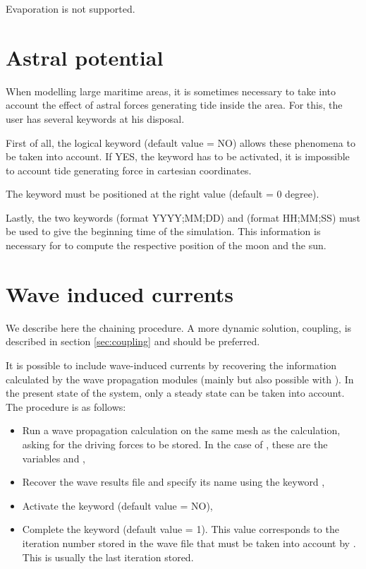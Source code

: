 Evaporation is not supported.


\section{Astral potential}
\label{sec:astral:pot}
When modelling large maritime areas, it is sometimes necessary to take into
account the effect of astral forces generating tide inside the area.
For this, the user has several keywords at his disposal.

First of all, the logical keyword 
(default value = NO) allows these phenomena to be taken into account.
If YES, the keyword  has to be activated,
it is impossible to account tide generating force in cartesian coordinates.

The keyword  must be positioned at the right
value (default = 0 degree).

Lastly, the two keywords  (format YYYY;MM;DD)
and  (format HH;MM;SS) must be used
to give the beginning time of the simulation.
This information is necessary for  to compute the respective
position of the moon and the sun.


\section{Wave induced currents}

We describe here the chaining procedure.
A more dynamic solution, coupling, is described in section \ref{sec:coupling}
and should be preferred.

It is possible to include wave-induced currents by recovering the information
calculated by the wave propagation modules (mainly \tomawac but also possible
with \artemis).
In the present state of the system, only a steady state can be taken into
account.
The procedure is as follows:

\begin{itemize}
\item Run a wave propagation calculation on the same mesh as the 
calculation, asking for the driving forces to be stored.
In the case of \tomawac, these are the variables  and ,

\item Recover the wave results file and specify its name using the keyword
,

\item Activate the keyword  (default value = NO),

\item Complete the keyword 
(default value = 1).
This value corresponds to the iteration number stored in the wave file that must
be taken into account by . This is usually the last iteration stored.
\end{itemize}

